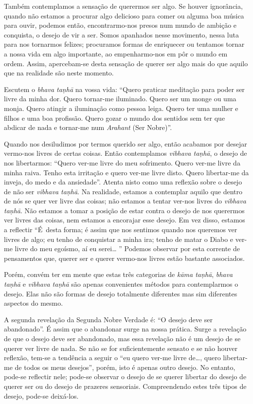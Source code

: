Também contemplamos a sensação de querermos ser algo. Se houver ignorância,
quando não estamos a procurar algo delicioso para comer ou alguma boa música
para ouvir, podemos então, encontrarmo-nos presos num mundo de ambição e
conquista, o desejo de vir a ser. Somos apanhados nesse movimento, nessa luta
para nos tornarmos felizes; procuramos formas de enriquecer ou tentamos tornar a
nossa vida em algo importante, ao empenharmo-nos em pôr o mundo em ordem. Assim,
apercebam-se desta sensação de querer ser algo mais do que aquilo que na
realidade são neste momento.

Escutem o \emph{bhava taṇhā} na vossa vida: “Quero praticar meditação para poder
ser livre da minha dor. Quero tornar-me iluminado. Quero ser um monge ou uma
monja. Quero atingir a iluminação como pessoa leiga. Quero ter uma mulher e
filhos e uma boa profissão. Quero gozar o mundo dos sentidos sem ter que abdicar
de nada e tornar-me num \emph{Arahant} (Ser Nobre)”.

Quando nos desiludimos por termos querido ser algo, então acabamos por desejar
vermo-nos livres de certas coisas. Então contemplamos \emph{vibhava taṇhā}, o
desejo de nos libertarmos: “Quero ver-me livre do meu sofrimento. Quero ver-me
livre da minha raiva. Tenho esta irritação e quero ver-me livre disto. Quero
libertar-me da inveja, do medo e da ansiedade”. Atenta nisto como uma reflexão
sobre o desejo de não ser \emph{vibhava taṇhā}. Na realidade, estamos a
contemplar aquilo que dentro de nós se quer ver livre das coisas; não estamos a
tentar ver-nos livres do \emph{vibhava taṇhā}. Não estamos a tomar a posição de
estar contra o desejo de nos querermos ver livres das coisas, nem estamos a
encorajar esse desejo. Em vez disso, estamos a reflectir “É~desta forma; é assim
que nos sentimos quando nos queremos ver livres de algo; eu tenho de conquistar
a minha ira; tenho de matar o Diabo e ver-me livre do meu egoísmo, aí eu
serei\ldots{} ” Podemos observar por esta corrente de pensamentos que, querer ser e
querer vermo-nos livres estão bastante associados.

Porém, convém ter em mente que estas três categorias de \emph{kāma taṇhā},
\emph{bhava taṇhā} e \emph{vibhava taṇhā} são apenas convenientes métodos para
contemplarmos o desejo. Elas não são formas de desejo totalmente diferentes mas
sim diferentes aspectos do mesmo.

A segunda revelação da Segunda Nobre Verdade é: “O desejo deve ser abandonado”.
É assim que o abandonar surge na nossa prática. Surge a revelação de que o
desejo deve ser abandonado, mas essa revelação não é um desejo de se querer ver
livre de nada. Se não se for suficientemente sensato e se não houver reflexão,
tem-se a tendência a seguir o “eu quero ver-me livre de\ldots{}, quero
libertar-me de todos os meus desejos”, porém, isto é apenas outro desejo. No
entanto, pode-se reflectir nele; pode-se observar o desejo de se querer libertar
do desejo de querer ser ou do desejo de prazeres sensoriais. Compreendendo estes
três tipos de desejo, pode-se deixá-los.

